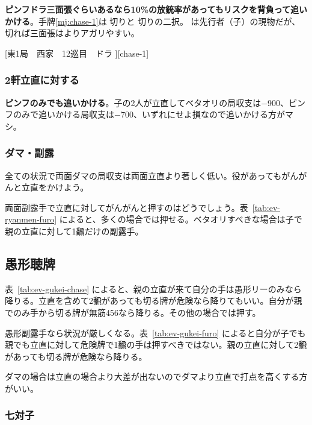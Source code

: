 \documentclass[10pt, twocolumn]{article}
\begin{document}
\textbf{ピンフドラ三面張ぐらいあるなら10\%の放銃率があってもリスクを背負って追いかける}\citep[][pp.~121--122]{miinin-choice}。手牌\ref{mj:chase-1}は  切りと  切りの二択。 は先行者（子）の現物だが、 切れば三面張はよりアガリやすい。

[東1局　西家　12巡目　ドラ ][chase-1]

\subsubsection*{2軒立直に対する}

\textbf{ピンフのみでも追いかける}\citep[][pp.~151--152]{miinin-choice}。子の2人が立直してベタオリの局収支は$-$900、ピンフのみで追いかける局収支は$-700$、いずれにせよ損なので追いかける方がマシ。

\subsubsection*{ダマ・副露}

全ての状況で両面ダマの局収支は両面立直より著しく低い\citep[][p. 92]{miinin-stat}。役があってもがんがんと立直をかけよう。

両面副露手で立直に対してがんがんと押すのはどうでしょう。表~\ref{tab:ev-ryanmen-furo} によると、多くの場合では押せる。ベタオリすべきな場合は子で親の立直に対して1飜だけの副露手。

\subsection{愚形聴牌}

表~\ref{tab:ev-gukei-chase} によると、親の立直が来て自分の手は愚形リーのみなら降りる。立直を含めて2飜があっても切る牌が危険なら降りてもいい。自分が親でのみ手から切る牌が無筋456なら降りる。その他の場合では押す。

愚形副露手なら状況が厳しくなる。表~\ref{tab:ev-gukei-furo} によると自分が子でも親でも立直に対して危険牌で1飜の手は押すべきではない。親の立直に対して2飜があっても切る牌が危険なら降りる。

ダマの場合は立直の場合より大差が出ないのでダマより立直で打点を高くする方がいい\citep[][p. 103]{miinin-stat}。

\subsubsection*{七対子}
\end{document}
